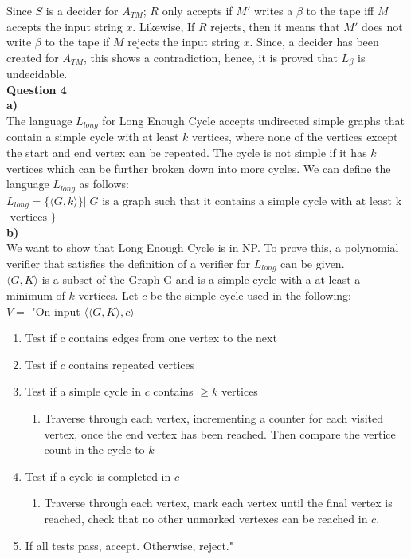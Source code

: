 \documentclass{article}
\begin{document}
Since $S$ is a decider for $A_{TM}$; $R$ only accepts if $M'$ writes a $\beta$ to the tape iff $M$ accepts the input string $x$. Likewise, If $R$ rejects, then it means that $M'$ does not write $\beta$ to the tape if $M$ rejects the input string $x$. Since, a decider has been created for $A_{TM}$, this shows a contradiction, hence, it is proved that $L_{\beta}$ is undecidable. \\

\bigskip
{\bf Question 4}\\
{\bf a)}\\
The language $L_{long}$ for Long Enough Cycle accepts undirected simple graphs that contain a simple cycle with at least $k$ vertices, where none of the vertices except the start and end vertex can be repeated. The cycle is not simple if it has $k$ vertices which can be further broken down into more cycles. We can define the language $L_{long}$ as follows:\\

$L_{long} =\{ \langle G, k \rangle \} | \; G \text{ is a graph such that it contains a simple cycle with at least } $k$ \text{ vertices } \}$\\

{\bf b)}\\
We want to show that Long Enough Cycle is in NP. To prove this, a polynomial verifier that satisfies the definition of a verifier for $L_{long}$ can be given.\\

$\langle G, K \rangle$ is a subset of the Graph G and is a simple cycle with a at least a minimum of $k$ vertices. Let $c$ be the simple cycle used in the following:\\


$V=$ "On input $\langle \langle G,K \rangle, c \rangle$
\begin{enumerate}
    \item Test if c contains edges from one vertex to the next 
    \item Test if $c$ contains repeated vertices
    \item Test if a simple cycle in $c$ contains $\geq k$ vertices
    \begin{enumerate}
       \item Traverse through each vertex, incrementing a counter for each visited vertex, once the end vertex has been reached. Then compare the vertice count in the cycle to $k$
    \end{enumerate}
    \item Test if a cycle is completed in $c$
    \begin{enumerate}
        \item Traverse through each vertex, mark each vertex until the final vertex is reached, check that no other unmarked vertexes can be reached in $c$.
    \end{enumerate}
    \item If all tests pass, accept. Otherwise, reject."
\end{enumerate}
\end{document}
